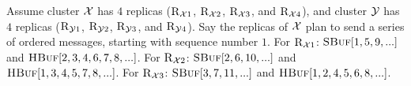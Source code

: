
\begin{example}\label{ex:rep-send}
Assume cluster $\mathcal{X}$ has $4$ replicas ($\textsc{R}_{{\mathcal{X}}{1}}$, $\textsc{R}_{{\mathcal{X}}{2}}$, $\textsc{R}_{{\mathcal{X}}{3}}$, and $\textsc{R}_{{\mathcal{X}}{4}}$), 
and 
cluster $\mathcal{Y}$ has $4$ replicas ($\textsc{R}_{{\mathcal{Y}}{1}}$, $\textsc{R}_{{\mathcal{Y}}{2}}$, $\textsc{R}_{{\mathcal{Y}}{3}}$, and $\textsc{R}_{{\mathcal{Y}}{4}}$).
Say the replicas of $\mathcal{X}$ plan to send a series of ordered messages, starting with sequence number $1$. 
For $\textsc{R}_{{\mathcal{X}}{1}}$: $\textsc{SBuf}[{1,5,9,...}]$ and $\textsc{HBuf}[{2,3,4,6,7,8,...}]$. 
For $\textsc{R}_{{\mathcal{X}}{2}}$: $\textsc{SBuf}[{2,6,10,...}]$ and $\textsc{HBuf}[{1,3,4,5,7,8,...}]$.
For $\textsc{R}_{{\mathcal{X}}{3}}$: $\textsc{SBuf}[{3,7,11,...}]$ and $\textsc{HBuf}[{1,2,4,5,6,8,...}]$.
\end{example}




